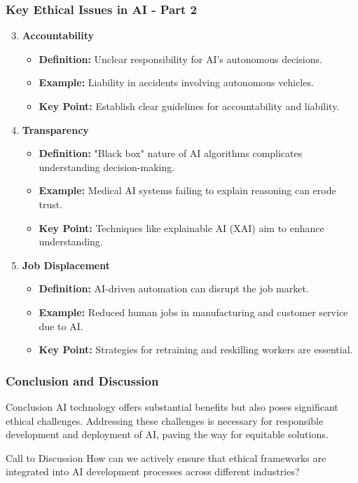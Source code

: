 \documentclass[aspectratio=169]{beamer}
\begin{document}
\begin{frame}[fragile]
    \frametitle{Key Ethical Issues in AI - Part 2}
    \begin{enumerate}
        \setcounter{enumi}{2} %
        \item \textbf{Accountability}
        \begin{itemize}
            \item \textbf{Definition:} Unclear responsibility for AI's autonomous decisions.
            \item \textbf{Example:} Liability in accidents involving autonomous vehicles.
            \item \textbf{Key Point:} Establish clear guidelines for accountability and liability.
        \end{itemize}

        \item \textbf{Transparency}
        \begin{itemize}
            \item \textbf{Definition:} "Black box" nature of AI algorithms complicates understanding decision-making.
            \item \textbf{Example:} Medical AI systems failing to explain reasoning can erode trust.
            \item \textbf{Key Point:} Techniques like explainable AI (XAI) aim to enhance understanding.
        \end{itemize}

        \item \textbf{Job Displacement}
        \begin{itemize}
            \item \textbf{Definition:} AI-driven automation can disrupt the job market.
            \item \textbf{Example:} Reduced human jobs in manufacturing and customer service due to AI.
            \item \textbf{Key Point:} Strategies for retraining and reskilling workers are essential.
        \end{itemize}
    \end{enumerate}
\end{frame}

\begin{frame}[fragile]
    \frametitle{Conclusion and Discussion}
    \begin{block}{Conclusion}
        AI technology offers substantial benefits but also poses significant ethical challenges. Addressing these challenges is necessary for responsible development and deployment of AI, paving the way for equitable solutions.
    \end{block}
    
    \begin{block}{Call to Discussion}
        How can we actively ensure that ethical frameworks are integrated into AI development processes across different industries?
    \end{block}
\end{frame}
\end{document}
